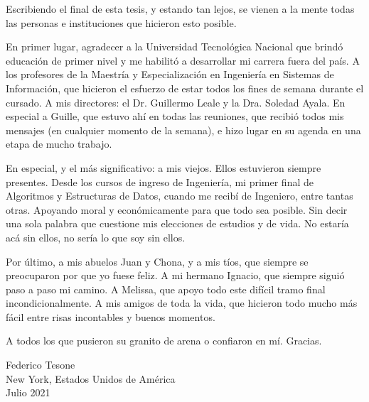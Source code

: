 \acknowledgements
Escribiendo el final de esta tesis, y estando tan lejos, se vienen a la mente todas las personas e instituciones que hicieron esto posible.

\bigskip En primer lugar, agradecer a la Universidad Tecnológica Nacional que brindó educación de primer nivel y me habilitó a desarrollar mi carrera fuera del país. A los profesores de la Maestría y Especialización en Ingeniería en Sistemas de Información, que hicieron el esfuerzo de estar todos los fines de semana durante el cursado. A mis directores: el Dr. Guillermo Leale y la Dra. Soledad Ayala. En especial a Guille, que estuvo ahí en todas las reuniones, que recibió todos mis mensajes (en cualquier momento de la semana), e hizo lugar en su agenda en una etapa de mucho trabajo.

\bigskip En especial, y el más significativo: a mis viejos. Ellos estuvieron siempre presentes. Desde los cursos de ingreso de Ingeniería, mi primer final de Algoritmos y Estructuras de Datos, cuando me recibí de Ingeniero, entre tantas otras. Apoyando moral y económicamente para que todo sea posible. Sin decir una sola palabra que cuestione mis elecciones de estudios y de vida. No estaría acá sin ellos, no sería lo que soy sin ellos.

\bigskip Por último, a mis abuelos Juan y Chona, y a mis tíos, que siempre se preocuparon por que yo fuese feliz. A mi hermano Ignacio, que siempre siguió paso a paso mi camino. A Melissa, que apoyo todo este difícil tramo final incondicionalmente. A mis amigos de toda la vida, que hicieron todo mucho más fácil entre risas incontables y buenos momentos.

\bigskip A todos los que pusieron su granito de arena o confiaron en mí. Gracias.

\vspace*{\fill}

\begin{flushright}
	Federico Tesone\\
	New York, Estados Unidos de América\\
	Julio 2021
\end{flushright}
